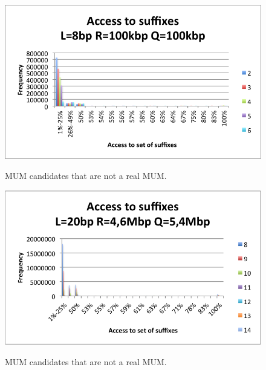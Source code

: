 \documentclass[runningheads,a4paper]{llncs}
\begin{document}
\begin{figure}
\centering
\includegraphics[scale=0.5]{100k.png}
\label{fig:100k}
\caption{MUM candidates that are not a real MUM.}
\end{figure}
\begin{figure}
\centering
\includegraphics[scale=0.5]{Ecoli.png}
\label{fig:ecoli}
\caption{MUM candidates that are not a real MUM.}
\end{figure}
\end{document}
